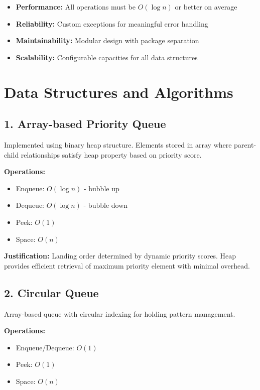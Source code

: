 \documentclass[12pt,a4paper]{article}
\begin{document}
\begin{itemize}
    \item \textbf{Performance:} All operations must be $O(\log n)$ or better on average
    \item \textbf{Reliability:} Custom exceptions for meaningful error handling
    \item \textbf{Maintainability:} Modular design with package separation
    \item \textbf{Scalability:} Configurable capacities for all data structures
\end{itemize}

\section{Data Structures and Algorithms}

\subsection{1. Array-based Priority Queue}

Implemented using binary heap structure. Elements stored in array where parent-child relationships satisfy heap property based on priority score.

\textbf{Operations:}
\begin{itemize}
    \item Enqueue: $O(\log n)$ - bubble up
    \item Dequeue: $O(\log n)$ - bubble down
    \item Peek: $O(1)$
    \item Space: $O(n)$
\end{itemize}

\textbf{Justification:} Landing order determined by dynamic priority scores. Heap provides efficient retrieval of maximum priority element with minimal overhead.

\subsection{2. Circular Queue}

Array-based queue with circular indexing for holding pattern management.

\textbf{Operations:}
\begin{itemize}
    \item Enqueue/Dequeue: $O(1)$
    \item Peek: $O(1)$
    \item Space: $O(n)$
\end{itemize}
\end{document}
